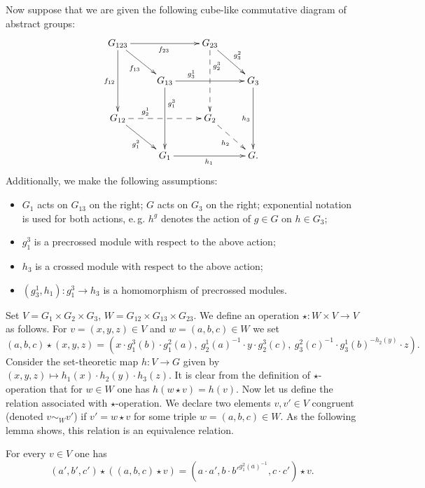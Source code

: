 Now suppose that we are given the following cube-like commutative diagram of abstract groups:
\begin{equation} \label{eq:cube} \begin{split} \xymatrix{
    G_{123} \ar[rr]_{f_{23}} \ar[dd]_{f_{12}} \ar[rd]_{f_{13}} &                        & G_{23} \ar@{-->}[dd]^(.3){g_2^3} \ar[rd]^{g^2_3} &           \\
    & G_{13} \ar[rr]^(.3){g^1_3} \ar^(.3){g^3_1}[dd] &                   & G_3 \ar[dd]_{h_3} \\
    G_{12} \ar@{-->}[rr]^(.3){g_2^1} \ar[rd]_{g_1^2}          &                        & G_2 \ar@{-->}[rd]_{h_2}         &           \\
    & G_1 \ar[rr]_{h_1}              &                   & G.} \end{split} \end{equation}
Additionally, we make the following assumptions:
\begin{itemize}
    \item $G_1$ acts on $G_{13}$ on the right; $G$ acts on $G_3$ on the right;
    exponential notation is used for both actions, e.\,g. $h^g$ denotes the action of $g \in G$ on $h \in G_{3}$;
    \item $g_1^3$ is a precrossed module with respect to the above action;
    \item $h_3$ is a crossed module with respect to the above action;
    \item $(g_3^1, h_1) \colon g_1^3 \to h_3$ is a homomorphism of precrossed modules.
\end{itemize}
Set $V = G_1 \times G_2 \times G_3$, $W = G_{12} \times G_{13} \times G_{23}$.
We define an operation $\star \colon W \times V \to V$ as follows.
For $v = (x, y, z) \in V$ and $w = (a, b, c) \in W$ we set
\[(a, b, c) \star (x, y, z) = (x \cdot g_1^3(b) \cdot g_1^2(a),\ g_2^1(a)^{-1} \cdot y \cdot g_2^3(c),\ g_3^2(c)^{-1} \cdot g_3^1(b)^{-h_2(y)} \cdot z).\]
Consider the set-theoretic map $h \colon V \to G$ given by $(x, y, z) \mapsto h_1(x) \cdot h_2(y) \cdot h_3(z)$.
It is clear from the definition of $\star$-operation that for $w \in W$ one has $h(w \star v) = h(v).$
Now let us define the relation associated with $\star$-operation.
We declare two elements $v, v' \in V$ congruent (denoted $v \sim_W v'$) if $v' = w \star v$ for some triple $w=(a, b, c) \in W$.
As the following lemma shows, this relation is an equivalence relation.
\begin{lemma} For every $v \in V$ one has
\begin{equation*}(a', b', c') \star \left( (a, b, c) \star v \right) = (a \cdot a', b \cdot {b'}^{g_1^2(a)^{-1}}, c \cdot c') \star v.\end{equation*}
\end{lemma}
